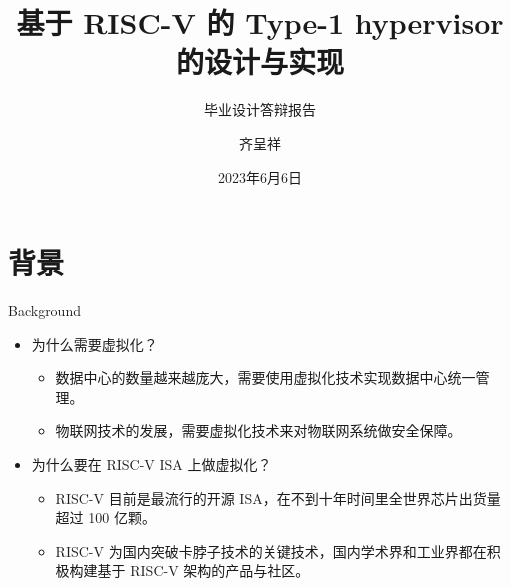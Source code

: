 \documentclass{beamer}
\author{齐呈祥}
\title{基于 RISC-V 的 Type-1 hypervisor 的设计与实现}
\subtitle{毕业设计答辩报告}
\institute{指导老师：李罡}
\date{2023年6月6日}
\begin{document}
  \kaishu
  \begin{frame}
    \titlepage
  \end{frame}

  \begin{frame}
    \addtocounter{framenumber}{-1}
    \tableofcontents[sectionstyle=show,subsectionstyle=show/shaded/hide,subsubsectionstyle=show/shaded/hide]
  \end{frame}


  \section{背景}
  \begin{frame}{Background}
    \begin{itemize} %
      \item 为什么需要虚拟化？
      \begin{itemize}
          \item 数据中心的数量越来越庞大，需要使用虚拟化技术实现数据中心统一管理。
          \item 物联网技术的发展，需要虚拟化技术来对物联网系统做安全保障。
      \end{itemize}
      \item 为什么要在 RISC-V ISA 上做虚拟化？
      \begin{itemize}
          \item RISC-V 目前是最流行的开源 ISA，在不到十年时间里全世界芯片出货量超过 100 亿颗。
          \item RISC-V 为国内突破卡脖子技术的关键技术，国内学术界和工业界都在积极构建基于 RISC-V 架构的产品与社区。
      \end{itemize}
    \end{itemize}
  \end{frame}
\end{document}
